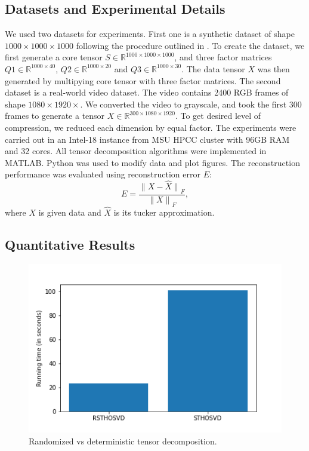 \documentclass[preprint]{elsarticle}
\begin{document}
\subsection{Datasets and Experimental Details}
\noindent We used two datasets for experiments. First one is a synthetic dataset of shape $1000\times1000\times1000$
following the procedure outlined in \cite{9350569}. To create the dataset, we first generate a core tensor
$S \in\mathbb{R}^{1000\times1000\times1000}$, and three factor matrices $Q1 \in \mathbb{R}^{1000\times40}$,
$Q2 \in \mathbb{R}^{1000\times20}$ and $Q3 \in \mathbb{R}^{1000\times30}$. The data tensor $X$ was then generated by
multipying core tensor with three factor matrices.
\vskip0.3cm
\noindent The second dataset is a real-world video dataset. The video contains 2400 RGB frames of shape $1080\times1920\times$.
We converted the video to grayscale, and took the first 300 frames to generate a tensor $X \in \mathbb{R}^{300\times1080\times1920}$.
To get desired level of compression, we reduced each dimension by equal factor.
\vskip0.3cm
\noindent The experiments were carried out in an Intel-18 instance from MSU HPCC cluster with 96GB RAM and 32 cores.
All tensor decomposition algorithms were implemented in MATLAB. Python was used to modify data and plot figures. 
\vskip0.3cm
\noindent The reconstruction performance was evaluated using reconstruction error $E$:
\begin{equation*}
    E = \frac{{\lVert X-\hat{X} \rVert}_F}{{\lVert X \rVert}_F},
\end{equation*}
\noindent where $X$ is given data and $\hat{X}$ is its tucker approximation.

\subsection{Quantitative Results}


\begin{figure}[H]
    \centering
    \includegraphics[scale=0.6]{figs/rVSd.png}
    \caption{Randomized vs deterministic tensor decomposition.}
    \label{rvsd}
\end{figure}
\end{document}
